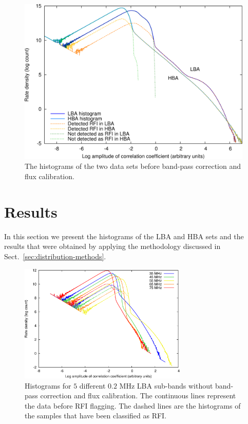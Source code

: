 \documentclass[useAMS,usenatbib]{mn2e}
\begin{document}
\begin{figure}
\begin{center}
\includegraphics[width=12cm]{img/histograms-raw-trimmed}
\caption{The histograms of the two data sets before band-pass correction and flux calibration.}
\label{fig:Histograms-raw}
\end{center}
\end{figure}

\section{Results} \label{sec:dist-results}
In this section we present the histograms of the LBA and HBA sets and the results that were obtained by applying the methodology discussed in Sect.~\ref{sec:distribution-methods}. 

\begin{figure}
\begin{center}
\includegraphics[width=8cm]{img/plot-lba-dist-per-frequency-trimmed}
\caption{Histograms for $5$ different $0.2$ MHz LBA sub-bands without band-pass correction and flux calibration. The continuous lines represent the data before RFI flagging. The dashed lines are the histograms of the samples that have been classified as RFI.}
\label{fig:plot-dist-per-frequency-LBA}
\end{center}
\end{figure}
\end{document}
